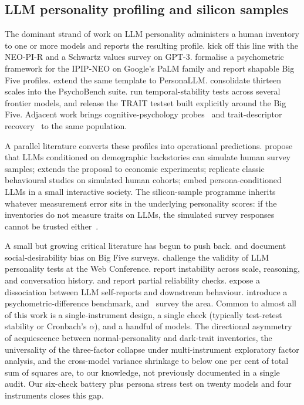 \documentclass[11pt]{article}
\begin{document}
\subsection{LLM personality profiling and silicon samples}
\label{sec:related-profiling}

The dominant strand of work on LLM personality administers a human inventory to one or more models and reports the resulting profile. \citet{miotto2023gpt3} kick off this line with the NEO-PI-R and a Schwartz values survey on GPT-3. \citet{serapio2025psychometric} formalise a psychometric framework for the IPIP-NEO on Google's PaLM family and report shapable Big Five profiles. \citet{jiang2023personallm} extend the same template to PersonaLLM. \citet{huang2023psychobench} consolidate thirteen scales into the PsychoBench suite. \citet{bodroza2024personality} run temporal-stability tests across several frontier models, and \citet{lee2025trait} release the TRAIT testset built explicitly around the Big Five. Adjacent work brings cognitive-psychology probes~\citep{binz2023psychology} and trait-descriptor recovery~\citep{suh2024rediscovering} to the same population.

A parallel literature converts these profiles into operational predictions. \citet{argyle2023one} propose that LLMs conditioned on demographic backstories can simulate human survey samples; \citet{horton2023homo} extends the proposal to economic experiments; \citet{aher2023using} replicate classic behavioural studies on simulated human cohorts; \citet{park2023generative} embed persona-conditioned LLMs in a small interactive society. The silicon-sample programme inherits whatever measurement error sits in the underlying personality scores: if the inventories do not measure traits on LLMs, the simulated survey responses cannot be trusted either~\citep{tjuatja2023response,salecha2024llm}.

A small but growing critical literature has begun to push back. \citet{acerbi2024llm} and \citet{salecha2024llm} document social-desirability bias on Big Five surveys. \citet{suhr2025challenging} challenge the validity of LLM personality tests at the Web Conference. \citet{pelet2025persistent} report instability across scale, reasoning, and conversation history. \citet{hagendorff2024machine} and \citet{schaekermann2024personality} report partial reliability checks. \citet{han2025personality} expose a dissociation between LLM self-reports and downstream behaviour. \citet{xie2025aipsychobench} introduce a psychometric-difference benchmark, and~\citet{chen2025humanizing} survey the area. Common to almost all of this work is a single-instrument design, a single check (typically test-retest stability or Cronbach's $\alpha$), and a handful of models. The directional asymmetry of acquiescence between normal-personality and dark-trait inventories, the universality of the three-factor collapse under multi-instrument exploratory factor analysis, and the cross-model variance shrinkage to below one per cent of total sum of squares are, to our knowledge, not previously documented in a single audit. Our six-check battery plus persona stress test on twenty models and four instruments closes this gap.
\end{document}

